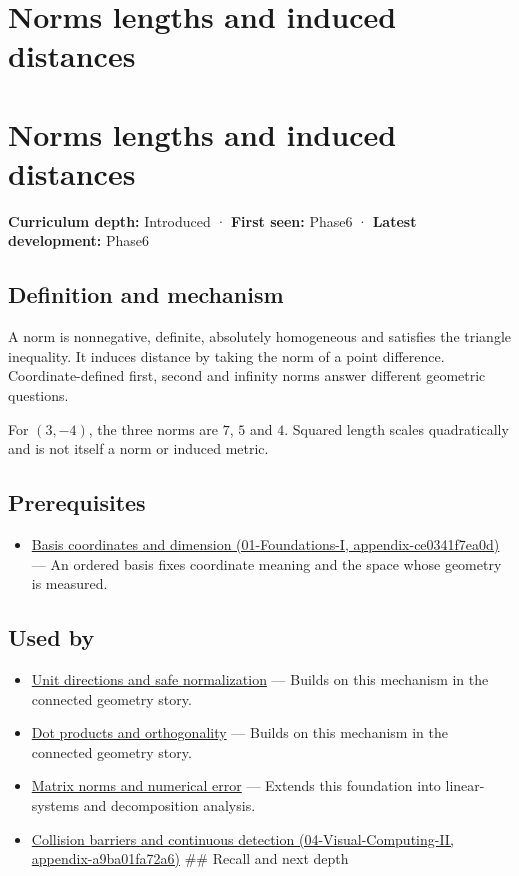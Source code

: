 \hypertarget{appendix-49933872bb51}{}
\section*{Norms lengths and induced distances}
\section{Norms lengths and induced distances}\label{appendix-49933872bb51-norms-lengths-and-induced-distances}

\textbf{Curriculum depth:} Introduced · \textbf{First seen:} Phase6 · \textbf{Latest development:} Phase6

\subsection{Definition and mechanism}\label{appendix-49933872bb51-definition-and-mechanism}

A norm is nonnegative, definite, absolutely homogeneous and satisfies the triangle inequality. It induces distance by taking the norm of a point difference. Coordinate-defined first, second and infinity norms answer different geometric questions.

For \((3,-4)\), the three norms are \(7\), \(5\) and \(4\). Squared length scales quadratically and is not itself a norm or induced metric.

\subsection{Prerequisites}\label{appendix-49933872bb51-prerequisites}

\begin{itemize}
\tightlist
\item
  \href{../01-Foundations-I/main.pdf\#nameddest=appendix-ce0341f7ea0d}{Basis coordinates and dimension (01-Foundations-I, appendix-ce0341f7ea0d)} --- An ordered basis fixes coordinate meaning and the space whose geometry is measured.
\end{itemize}

\subsection{Used by}\label{appendix-49933872bb51-used-by}

\begin{itemize}
\item
  \hyperref[appendix-f744e41b95b4]{Unit directions and safe normalization} --- Builds on this mechanism in the connected geometry story.
\item
  \hyperref[appendix-8bc4e8fc547c]{Dot products and orthogonality} --- Builds on this mechanism in the connected geometry story.
\item
  \hyperref[appendix-f8657bac66e5]{Matrix norms and numerical error} --- Extends this foundation into linear-systems and decomposition analysis.
\item
  \href{../04-Visual-Computing-II/main.pdf\#nameddest=appendix-a9ba01fa72a6}{Collision barriers and continuous detection (04-Visual-Computing-II, appendix-a9ba01fa72a6)} \#\# Recall and next depth
\end{itemize}

